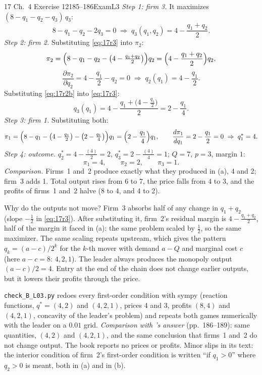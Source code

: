 \begin{exsol}{17}{\MG{} Ch.~4 Exercise 12}{185--186}{Exam}{L3}
\emph{Step 1: firm 3.} It maximizes $(8 - q_1 - q_2 - q_3)\,q_3$:
\begin{equation}
  8 - q_1 - q_2 - 2q_3 = 0 \;\Rightarrow\; q_3(q_1,q_2) = 4 - \frac{q_1 + q_2}{2}. \label{eq:17r3}
\end{equation}
\emph{Step 2: firm 2.} Substituting \eqref{eq:17r3} into $\pi_2$:
\[
  \pi_2 = \Bigl(8 - q_1 - q_2 - \bigl(4 - \tfrac{q_1+q_2}{2}\bigr)\Bigr) q_2
        = \Bigl(4 - \frac{q_1 + q_2}{2}\Bigr) q_2 ,
\]
\begin{equation}
  \frac{\partial \pi_2}{\partial q_2} = 4 - \frac{q_1}{2} - q_2 = 0
  \;\Rightarrow\; q_2(q_1) = 4 - \frac{q_1}{2}. \label{eq:17r2b}
\end{equation}
Substituting \eqref{eq:17r2b} into \eqref{eq:17r3}:
\[
  q_3(q_1) = 4 - \frac{q_1 + \bigl(4 - \frac{q_1}{2}\bigr)}{2} = 2 - \frac{q_1}{4}.
\]
\emph{Step 3: firm 1.} Substituting both:
\[
  \pi_1 = \Bigl(8 - q_1 - \bigl(4 - \tfrac{q_1}{2}\bigr) - \bigl(2 - \tfrac{q_1}{4}\bigr)\Bigr) q_1
        = \Bigl(2 - \frac{q_1}{4}\Bigr) q_1 ,
  \qquad \frac{d\pi_1}{dq_1} = 2 - \frac{q_1}{2} = 0 \;\Rightarrow\; q_1^* = 4 .
\]
\emph{Step 4: outcome.} $q_2^* = 4 - \frac{(4)}{2} = 2$, $q_3^* = 2 - \frac{(4)}{4} = 1$;
$Q = 7$, $p = 3$, margin $1$:
\[
  \pi_1 = 4,\qquad \pi_2 = 2,\qquad \pi_3 = 1 .
\]
\emph{Comparison.} Firms~1 and~2 produce exactly what they produced in (a), 4 and 2; firm~3 adds 1.
Total output rises from 6 to 7, the price falls from 4 to 3, and the profits of firms~1 and~2 halve
(8 to 4, and 4 to 2).

\interp Why do the outputs not move? Firm~3 absorbs half of any change in $q_1 + q_2$
(slope $-\frac12$ in \eqref{eq:17r3}). After substituting it, firm~2's residual margin is
$4 - \frac{q_1 + q_2}{2}$, half of the margin it faced in (a): the same problem scaled by $\frac12$,
so the same maximizer. The same scaling repeats upstream, which gives the pattern
$q_k = (a - c)/2^k$ for the $k$-th mover with demand $a - Q$ and marginal cost $c$ (here
$a - c = 8$: $4, 2, 1$). The leader always produces the
monopoly output $(a-c)/2 = 4$. Entry at the end of the chain does not change earlier outputs, but
it lowers their profits through the price.

\verify \texttt{check\_B\_L03.py} redoes every first-order condition with sympy (reaction functions,
$q^* = (4,2)$ and $(4,2,1)$, prices 4 and 3, profits $(8,4)$ and $(4,2,1)$, concavity of the
leader's problem) and repeats both games numerically with the leader on a $0.01$ grid. \emph{Comparison
with \MG{}'s answer} (pp.~186--189): same quantities, $(4,2)$ and $(4,2,1)$, and the same conclusion
that firms~1 and~2 do not change output. The book reports no prices or profits. Minor slips in its
text: the interior condition of firm~2's first-order condition is written ``if $q_1 > 0$'' where
$q_2 > 0$ is meant, both in (a) and in (b).

\end{exsol}
